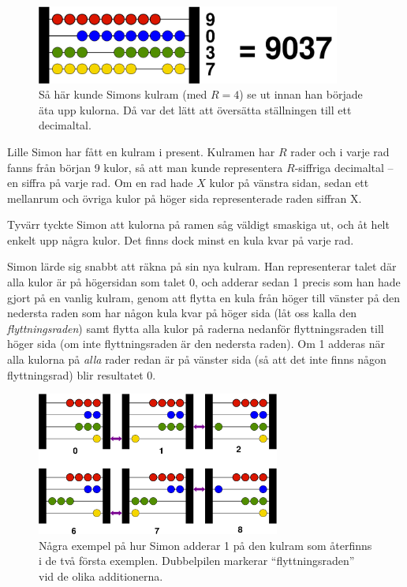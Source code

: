
\begin{figure}[h] 
\begin{center}
\includegraphics[width=10cm]{kulram0.png}
\caption{Så här kunde Simons kulram (med $R=4$) se ut innan han började äta
  upp kulorna. Då var det lätt att översätta ställningen till ett decimaltal.}
\end{center} 
\end{figure}
\vspace{-2cm}

Lille Simon har fått en kulram i present. Kulramen har $R$ rader och i
varje rad fanns från början 9 kulor, så att man kunde representera
$R$-siffriga decimaltal -- en siffra på varje rad. Om en rad hade $X$
kulor på vänstra sidan, sedan ett mellanrum och övriga kulor på höger sida representerade raden siffran X.

Tyvärr tyckte Simon att kulorna på ramen såg väldigt smaskiga ut, och åt helt enkelt upp några kulor. Det finns dock minst en kula kvar på varje rad.

Simon lärde sig snabbt att räkna på sin nya kulram. Han representerar
talet där alla kulor är på högersidan som talet 0, och adderar sedan 1
precis som han hade gjort på en vanlig kulram, genom att flytta en
kula från höger till vänster på den nedersta raden som har någon kula
kvar på höger sida (låt oss kalla den {\em flyttningsraden}) samt
flytta alla kulor på raderna nedanför flyttningsraden till höger sida
(om inte flyttningsraden är den nedersta raden). Om 1 adderas när alla
kulorna på {\em alla} rader redan är på vänster sida (så att det inte finns någon flyttningsrad) blir resultatet 0.

\begin{figure}[h] 
\begin{center}
\includegraphics[width=8cm]{kulram.png}
\caption{Några exempel på hur Simon adderar 1 på den kulram som återfinns i de två första exemplen. Dubbelpilen
  markerar ``flyttningsraden'' vid de olika additionerna.}
\end{center} 
\end{figure}

